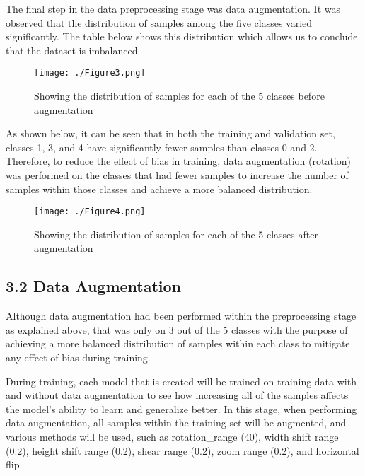 \documentclass[
]{article}
\begin{document}
The final step in the data preprocessing stage was data augmentation. It
was observed that the distribution of samples among the five classes
varied significantly. The table below shows this distribution which allows
us to conclude that the dataset is imbalanced.

\begin{figure}[hbt!]
  \centering
  \texttt{[image: ./Figure3.png]}
  \caption{Showing the distribution of samples for each of the 5 classes
before augmentation}
  \label{fig:figure3}
\end{figure}

As shown below, it can be seen that in both the training and validation
set, classes 1, 3, and 4 have significantly fewer samples than classes 0
and 2. Therefore, to reduce the effect of bias in training, data
augmentation (rotation) was performed on the classes that had fewer
samples to increase the number of samples within those classes and
achieve a more balanced distribution.

\begin{figure}[hbt!]
  \centering
  \texttt{[image: ./Figure4.png]}
  \caption{Showing the distribution of samples for each of the 5 classes
after augmentation}
  \label{fig:figure3}
\end{figure}

\newpage

\hypertarget{data-augmentation}{%
\subsection{\texorpdfstring{\textbf{3.2 Data
Augmentation}}{3.2 Data Augmentation}}\label{data-augmentation}}

Although data augmentation had been performed within the preprocessing
stage as explained above, that was only on 3 out of the 5 classes with
the purpose of achieving a more balanced distribution of samples within
each class to mitigate any effect of bias during training.

During training, each model that is created will be trained on training
data with and without data augmentation to see how increasing all of the
samples affects the model's ability to learn and generalize better. In
this stage, when performing data augmentation, all samples within the
training set will be augmented, and various methods will be used, such
as rotation\_range (40), width shift range (0.2), height shift range
(0.2), shear range (0.2), zoom range (0.2), and horizontal flip.
\end{document}
